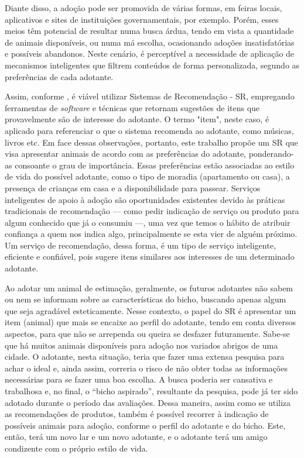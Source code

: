 \documentclass[portuguese]{textolivre}
\begin{document}
Diante disso, a adoção pode ser promovida de várias formas, em feiras locais, aplicativos e sites de instituições governamentais, por exemplo. Porém, esses meios têm potencial de resultar numa busca árdua, tendo em vista a quantidade de animais disponíveis, ou numa má escolha, ocasionando adoções insatisfatórias e possíveis abandonos. Neste cenário, é perceptível a necessidade de aplicação de mecanismos inteligentes que filtrem conteúdos de forma personalizada, segundo as preferências de cada adotante.

Assim, conforme \textcite{Ricci2011}, é viável utilizar Sistemas de Recomendação - SR, empregando ferramentas de \textit{software} e técnicas que retornam sugestões de itens que provavelmente são de interesse do adotante. O termo "item", neste caso, é aplicado para referenciar o que o sistema recomenda ao adotante, como músicas, livros etc. Em face dessas observações, portanto, este trabalho propõe um SR que visa apresentar animais de acordo com as preferências do adotante, ponderando-as consoante o grau de importância. Essas preferências estão associadas ao estilo de vida do possível adotante, como o tipo de moradia (apartamento ou casa), a presença de crianças em casa e a disponibilidade para passear. Serviços inteligentes de apoio à adoção são oportunidades existentes devido às práticas tradicionais de recomendação — como pedir indicação de serviço ou produto para algum conhecido que já o consumiu —, uma vez que temos o hábito de atribuir confiança a quem nos indica algo, principalmente se esta vier de alguém próximo. Um serviço de recomendação, dessa forma, é um tipo de serviço inteligente, eficiente e confiável, pois sugere itens similares aos interesses de um determinado adotante.

Ao adotar um animal de estimação, geralmente, os futuros adotantes não sabem ou nem se informam sobre as características do bicho, buscando apenas algum que seja agradável esteticamente. Nesse contexto, o papel do SR é apresentar um item (animal) que mais se encaixe ao perfil do adotante, tendo em conta diversos aspectos, para que não se arrependa ou queira se desfazer futuramente. Sabe-se que há muitos animais disponíveis para adoção nos variados abrigos de uma cidade. O adotante, nesta situação, teria que fazer uma extensa pesquisa para achar o ideal e, ainda assim, correria o risco de não obter todas as informações necessárias para se fazer uma boa escolha. A busca poderia ser cansativa e trabalhosa e, no final, o “bicho aspirado”, resultante da pesquisa, pode já ter sido adotado durante o período das avaliações. Dessa maneira, assim como se utiliza as recomendações de produtos, também é possível recorrer à indicação de possíveis animais para adoção, conforme o perfil do adotante e do bicho. Este, então, terá um novo lar e um novo adotante, e o adotante terá um amigo condizente com o próprio estilo de vida.
\end{document}
